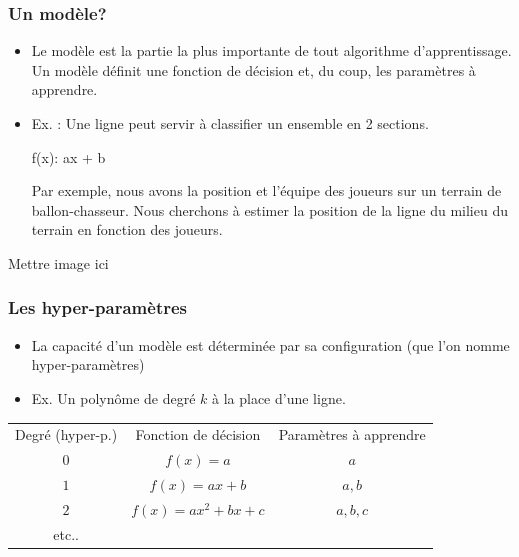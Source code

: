 \documentclass[french]{beamer}
\begin{document}
\begin{frame}
\frametitle{Un modèle?}
\begin{itemize}
\item Le modèle est la partie la plus importante de tout algorithme d'apprentissage. Un modèle définit une fonction de décision et, du coup, les paramètres à apprendre.

\item Ex. : Une ligne peut servir à classifier un ensemble en 2 sections. 

	f(x): ax + b

Par exemple, nous avons la position et l'équipe des joueurs sur un terrain de ballon-chasseur. Nous cherchons à estimer la position de la ligne du milieu du terrain en fonction des joueurs.

\end{itemize}

\begin{center}
Mettre image ici
\end{center}

\end{frame}

\begin{frame}
\frametitle{Les hyper-paramètres}

\begin{itemize}
\item La capacité d'un modèle est déterminée par sa configuration (que l'on nomme hyper-paramètres)

\item Ex. Un polynôme de degré $k$ à la place d'une ligne.
\end{itemize}

\begin{tabular}{ccc}
Degré (hyper-p.) & Fonction de décision & Paramètres à apprendre \\
$0$	& $f(x) = a$ & $a$ \\
$1$ & $f(x) = ax+b$ & $a,b$ \\
$2$ & $f(x) = ax^2 + bx + c$ & $a,b,c$ \\
etc..& &
\end{tabular}

\end{frame}
\end{document}
